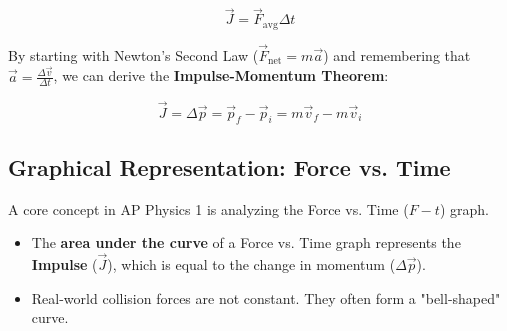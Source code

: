 \documentclass{article}
\begin{document}
\begin{equation}
\vec{J} = \vec{F}_{\text{avg}}\Delta t
\end{equation}

By starting with Newton's Second Law ($\vec{F}_{\text{net}} = m\vec{a}$) and remembering that $\vec{a} = \frac{\Delta \vec{v}}{\Delta t}$, we can derive the \textbf{Impulse-Momentum Theorem}:

\begin{equation}
\vec{J} = \Delta\vec{p} = \vec{p}_f - \vec{p}_i = m\vec{v}_f - m\vec{v}_i
\end{equation}

\subsection{Graphical Representation: Force vs. Time}
A core concept in AP Physics 1 is analyzing the Force vs. Time ($F-t$) graph.
\begin{itemize}
    \item The \textbf{area under the curve} of a Force vs. Time graph represents the \textbf{Impulse} ($\vec{J}$), which is equal to the change in momentum ($\Delta \vec{p}$).
    \item Real-world collision forces are not constant. They often form a "bell-shaped" curve. 
\end{itemize}
\end{document}
